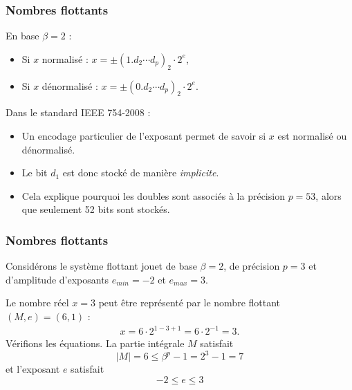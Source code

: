 \documentclass{beamer}
\begin{document}


\begin{frame}
\frametitle{Nombres flottants}

En base $\beta=2$ :
\begin{itemize}
\item Si $x$ normalisé :
$x = \pm  (1 . d_2\cdots d_p)_2 \cdot 2^e$,
\item Si $x$ dénormalisé :
$x = \pm  (0 . d_2\cdots d_p)_2 \cdot 2^e$.
\end{itemize}

Dans le standard IEEE 754-2008 :
\begin{itemize}
\item Un encodage particulier de 
l'exposant permet de savoir si $x$ est normalisé ou dénormalisé.
\item Le bit $d_1$ est donc stocké de manière \emph{implicite}. 
\item Cela explique pourquoi les doubles sont associés à la précision $p=53$, 
alors que seulement 52 bits sont stockés.
\end{itemize}

\end{frame}


\begin{frame}
\frametitle{Nombres flottants}

\begin{example}
Considérons le système flottant jouet de base $\beta=2$, de précision $p=3$ et 
d'amplitude d'exposants $e_{min}=-2$ et $e_{max}=3$. 

Le nombre réel $x=3$ peut être représenté par le nombre flottant 
$(M,e)=(6,1)$ :
\begin{eqnarray}
x = 6 \cdot 2^{1-3+1} = 6 \cdot 2^{-1} = 3.
\end{eqnarray}
Vérifions les équations. 
La partie intégrale $M$ satisfait 
$$
|M|=6\leq \beta^p-1=2^3-1 = 7
$$
et l'exposant $e$ satisfait 
$$
-2 \leq e \leq 3
$$
\end{example}

\end{frame}

\end{document}
